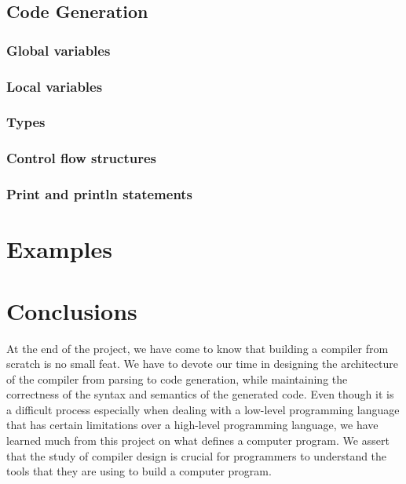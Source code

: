 \documentclass{article}
\begin{document}
\subsection{Code Generation}

\subsubsection{Global variables}

\subsubsection{Local variables}

\subsubsection{Types}

\subsubsection{Control flow structures}

\subsubsection{Print and println statements}

\section{Examples}

\section{Conclusions}
At the end of the project, we have come to know that building a compiler from scratch is no small feat. We have to devote our time in designing the architecture of the compiler from parsing to code generation, while maintaining the correctness of the syntax and semantics of the generated code. Even though it is a difficult process especially when dealing with a low-level programming language that has certain limitations over a high-level programming language, we have learned much from this project on what defines a computer program. We assert that the study of compiler design is crucial for programmers to understand the tools that they are using to build a computer program.
\end{document}
